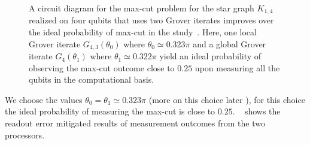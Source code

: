 \begin{figure}[h]
	\centering
	\caption[A circuit diagram for the \acs{max-cut} problem for the star graph $K_{1,4}$ realized on four qubits that uses two Grover iterates improves over the ideal probability of \acs{max-cut} in the study~\cite{Satoh_2020}.]{A circuit diagram for the \acs{max-cut} problem for the star graph $K_{1,4}$ realized on four qubits that uses two Grover iterates improves over the ideal probability of \acs{max-cut} in the study~\cite{Satoh_2020}. Here, one local Grover iterate $G_{4,3}(\theta_0)$ where ${\theta_0\simeq 0.323\pi}$ and a global Grover iterate $G_{4}(\theta_1)$ where ${\theta_1\simeq 0.322\pi}$ yield an ideal probability of observing the \acs{max-cut} outcome close to $0.25$ upon measuring all the qubits in the computational basis.}
\end{figure}

\noindent
We choose the values $\theta_0=\theta_1 \simeq 0.323 \pi$ (more on this choice later ), for this choice the ideal probability of measuring the \acs{max-cut} is close to $0.25$. ~ shows the readout error mitigated results of measurement outcomes from the two processors. 

